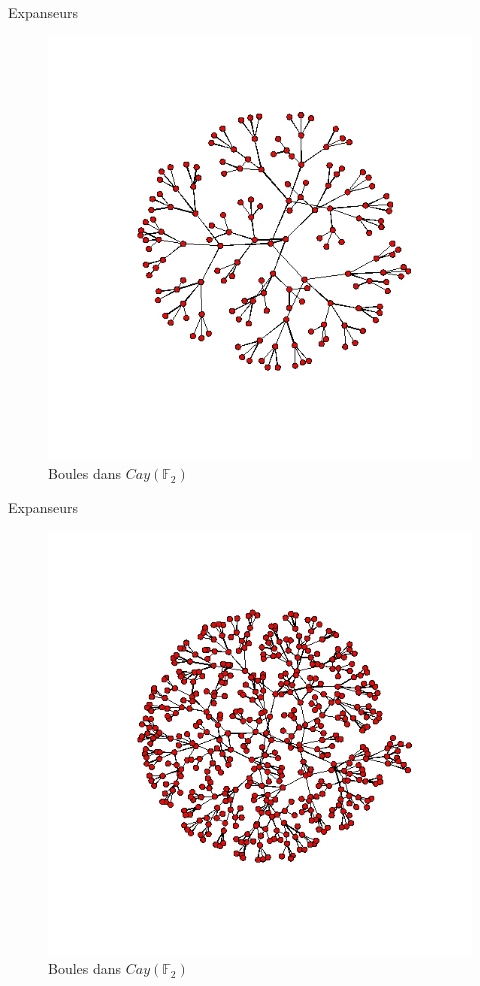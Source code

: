 \begin{frame}{Expanseurs}
\begin{figure}[h]\centering
\includegraphics[scale=0.35]{CayleyFree3.jpeg}
\caption{Boules dans $Cay(\mathbb F_2)$}
\label{fig:Cayley}
\end{figure}
\end{frame}
\begin{frame}{Expanseurs}
\begin{figure}[h]\centering
\includegraphics[scale=0.35]{CayleyFree4.jpeg}
\caption{Boules dans $Cay(\mathbb F_2)$}
\label{fig:Cayley}
\end{figure}
\end{frame}
